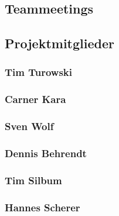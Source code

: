 



\subsection{Teammeetings}


\newpage
\subsection{Projektmitglieder}
\subsubsection{Tim Turowski}


\subsubsection{Carner Kara}


\subsubsection{Sven Wolf}


\subsubsection{Dennis Behrendt}


\subsubsection{Tim Silbum}


\subsubsection{Hannes Scherer}


